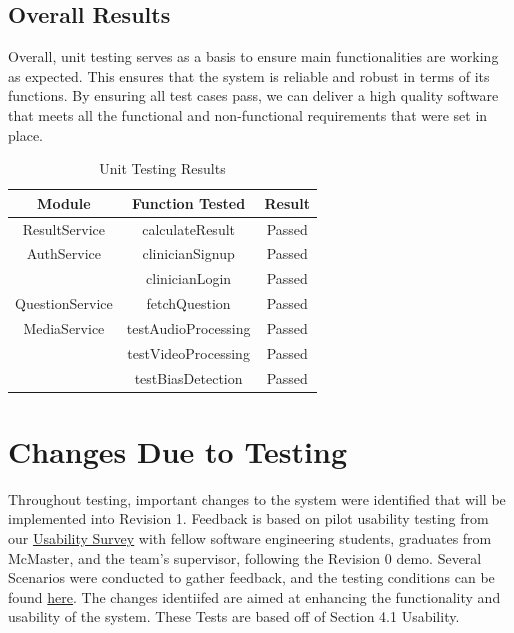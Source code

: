\documentclass[12pt, titlepage]{article}
\begin{document}
\newpage{}

  \subsection{Overall Results}

  \hspace{2em}Overall, unit testing serves as a basis to ensure main functionalities are working as expected. This ensures that the system is reliable and robust in terms of its 
  functions. By ensuring all test cases pass, we can deliver a high quality software that meets all the functional and non-functional requirements that were set in place. 

  \begin{table}[H]
    \centering
    \label{tab:unitTestingResults}
    \begin{tabular}{|c|c|c|}
      \hline
      \textbf{Module} & \textbf{Function Tested} & \textbf{Result} \\
      \hline
      ResultService & calculateResult & Passed \\
      \hline
      AuthService & clinicianSignup & Passed \\      
                  & clinicianLogin & Passed \\ 
      \hline
      QuestionService & fetchQuestion & Passed \\
      \hline
      MediaService & testAudioProcessing & Passed \\
                   & testVideoProcessing & Passed \\
                   & testBiasDetection & Passed \\
      \hline
    \end{tabular}
    \caption{Unit Testing Results}
\end{table}

\newpage{}

\section{Changes Due to Testing}

\hspace{2em} Throughout testing, important changes to the system were identified that will be implemented into Revision 1.
Feedback is based on pilot usability testing from our \href{https://forms.gle/izmWUf38F55xvUav8}{Usability Survey} with fellow software engineering students, graduates from McMaster, and the team's
supervisor, following the Revision 0 demo. Several Scenarios were conducted to gather feedback, and the testing conditions can be found \href{https://docs.google.com/document/d/1bl1iT6M5yDK34Rb4XSSEJdFDumOkUBKb_eB1skr2TXY/edit?usp=sharing}{here}. 
The changes identiifed are aimed at enhancing the functionality and usability of the system. These Tests are based off of Section 4.1 Usability.
\end{document}
